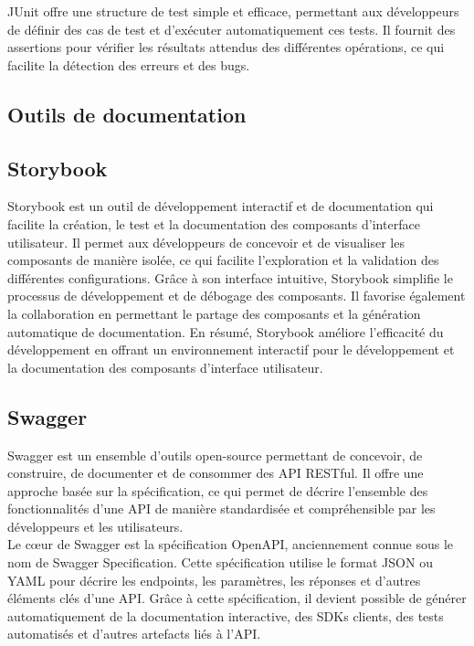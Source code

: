 JUnit offre une structure de test simple et efficace, permettant aux développeurs de définir des cas de test et d'exécuter automatiquement ces tests. Il fournit des assertions pour vérifier les résultats attendus des différentes opérations, ce qui facilite la détection des erreurs et des bugs.


\subsection{Outils de documentation}
\subsection*{Storybook}
Storybook est un outil de développement interactif et de documentation qui facilite la création,
le test et la documentation des composants d’interface utilisateur. Il permet aux développeurs
de concevoir et de visualiser les composants de manière isolée, ce qui facilite l’exploration et la
validation des différentes configurations. Grâce à son interface intuitive, Storybook simplifie le
processus de développement et de débogage des composants. Il favorise également la collaboration
en permettant le partage des composants et la génération automatique de documentation. En
résumé, Storybook améliore l’efficacité du développement en offrant un environnement interactif
pour le développement et la documentation des composants d’interface utilisateur.

\subsection*{Swagger}
Swagger est un ensemble d'outils open-source permettant de concevoir, de construire, de documenter et de consommer des API RESTful. Il offre une approche basée sur la spécification, ce qui permet de décrire l'ensemble des fonctionnalités d'une API de manière standardisée et compréhensible par les développeurs et les utilisateurs.\\

Le cœur de Swagger est la spécification OpenAPI, anciennement connue sous le nom de Swagger Specification. Cette spécification utilise le format JSON ou YAML pour décrire les endpoints, les paramètres, les réponses et d'autres éléments clés d'une API. Grâce à cette spécification, il devient possible de générer automatiquement de la documentation interactive, des SDKs clients, des tests automatisés et d'autres artefacts liés à l'API.



